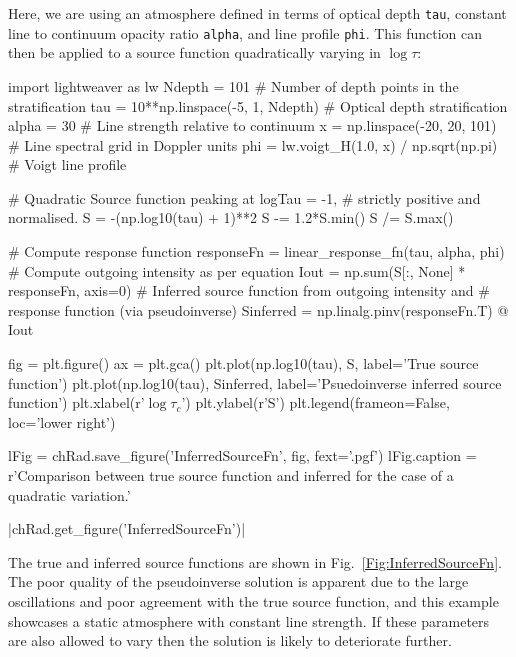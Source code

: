 Here, we are using an atmosphere defined in terms of optical depth \texttt{tau}, constant line to continuum opacity ratio \texttt{alpha}, and line profile \texttt{phi}.
This function can then be applied to a source function quadratically varying in $\log \tau$:

\begin{pyblock}[Radynversion]
import lightweaver as lw
Ndepth = 101 # Number of depth points in the stratification
tau = 10**np.linspace(-5, 1, Ndepth) # Optical depth stratification
alpha = 30 # Line strength relative to continuum
x = np.linspace(-20, 20, 101) # Line spectral grid in Doppler units
phi = lw.voigt_H(1.0, x) / np.sqrt(np.pi) # Voigt line profile

# Quadratic Source function peaking at logTau = -1,
# strictly positive and normalised.
S = -(np.log10(tau) + 1)**2
S -= 1.2*S.min()
S /= S.max()

# Compute response function
responseFn = linear_response_fn(tau, alpha, phi)
# Compute outgoing intensity as per equation
Iout = np.sum(S[:, None] * responseFn, axis=0)
# Inferred source function from outgoing intensity and
# response function (via pseudoinverse)
Sinferred = np.linalg.pinv(responseFn.T) @ Iout
\end{pyblock}

\begin{pycode}[Radynversion]
fig = plt.figure()
ax = plt.gca()
plt.plot(np.log10(tau), S, label='True source function')
plt.plot(np.log10(tau), Sinferred, label='Psuedoinverse inferred source function')
plt.xlabel(r'$\log\tau_c$')
plt.ylabel(r'S')
plt.legend(frameon=False, loc='lower right')

lFig = chRad.save_figure('InferredSourceFn', fig, fext='.pgf')
lFig.caption = r'Comparison between true source function and inferred for the case of a quadratic variation.'
\end{pycode}

\py[Radynversion]|chRad.get_figure('InferredSourceFn')|

The true and inferred source functions are shown in Fig.~\ref{Fig:InferredSourceFn}.
The poor quality of the pseudoinverse solution is apparent due to the large oscillations and poor agreement with the true source function, and this example showcases a static atmosphere with constant line strength.
If these parameters are also allowed to vary then the solution is likely to deteriorate further.

